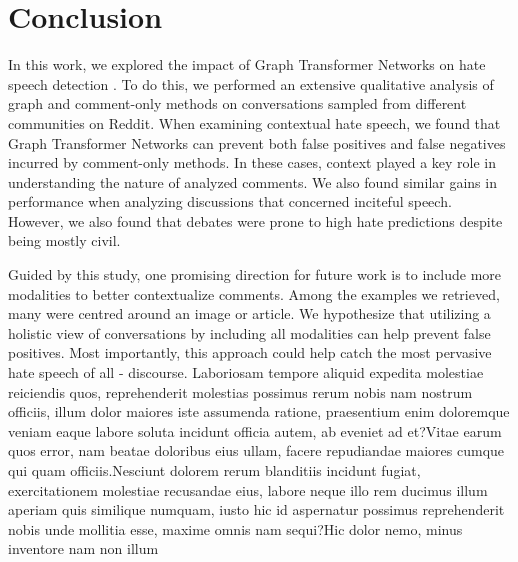 \documentclass[letterpaper]{article} %
\begin{document}
\vspace{-1.51mm}
\section{Conclusion}
In this work, we explored the impact of Graph Transformer Networks on hate speech detection \cite{hebert2022predicting}. To do this, we performed an extensive qualitative analysis of graph and comment-only methods on conversations sampled from different communities on Reddit. When examining contextual hate speech, we found that Graph Transformer Networks can prevent both false positives and false negatives incurred by comment-only methods. In these cases, context played a key role in understanding the nature of analyzed comments. We also found similar gains in performance when analyzing discussions that concerned inciteful speech. However, we also found that debates were prone to high hate predictions despite being mostly civil.

Guided by this study, one promising direction for future work is to include more modalities to better contextualize comments. Among the examples we retrieved, many were centred around an image or article. We hypothesize that utilizing a holistic view of conversations by including all modalities can help prevent false positives. Most importantly, this approach could help catch the most pervasive hate speech of all - discourse.  Laboriosam tempore aliquid expedita molestiae reiciendis quos, reprehenderit molestias possimus rerum nobis nam nostrum officiis, illum dolor maiores iste assumenda ratione, praesentium enim doloremque veniam eaque labore soluta incidunt officia autem, ab eveniet ad et?Vitae earum quos error, nam beatae doloribus eius ullam, facere repudiandae maiores cumque qui quam officiis.Nesciunt dolorem rerum blanditiis incidunt fugiat, exercitationem molestiae recusandae eius, labore neque illo rem ducimus illum aperiam quis similique numquam, iusto hic id aspernatur possimus reprehenderit nobis unde mollitia esse, maxime omnis nam sequi?Hic dolor nemo, minus inventore nam non illum

\end{document}
